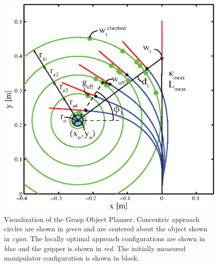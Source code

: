\begin{figure}[htpb]
\centering
   \includegraphics[width=0.85\columnwidth, trim = 0mm 0mm 5mm 5mm, clip]{Figures/processing_control/grasp_object_planner.eps}
   \caption{Visualization of the Grasp Object Planner. Concentric approach circles are shown in \emph{green} and are centered about the object shown in \emph{cyan}. The locally optimal approach configurations are shown in \emph{blue} and the gripper is shown in \emph{red}. The initially measured manipulator configuration is shown in black.}
   \label{fig:planGrasp}
\end{figure}

